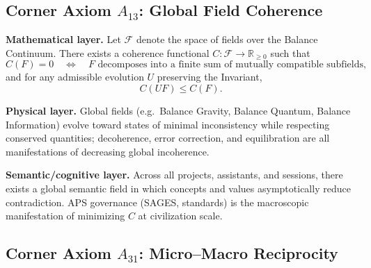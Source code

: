 \subsection{Corner Axiom $A_{13}$: Global Field Coherence}

\begin{axiom}
\label{ax:global-field}
\textbf{Mathematical layer.}
Let $\mathcal{F}$ denote the space of fields over the Balance Continuum.
There exists a coherence functional $C : \mathcal{F} \to \mathbb{R}_{\ge 0}$ such that
\[
  C(F) = 0 \quad \Longleftrightarrow \quad F \text{ decomposes into a finite sum of mutually compatible subfields},
\]
and for any admissible evolution $U$ preserving the Invariant,
\[
  C(UF) \leq C(F).
\]

\textbf{Physical layer.}
Global fields (e.g.\ Balance Gravity, Balance Quantum, Balance Information) evolve toward states of minimal inconsistency while respecting conserved quantities; decoherence, error correction, and equilibration are all manifestations of decreasing global incoherence.\cite{AurphyxThesis,AurphyxSymbiotic}

\textbf{Semantic/cognitive layer.}
Across all projects, assistants, and sessions, there exists a global semantic field in which concepts and values asymptotically reduce contradiction.
APS governance (SAGES, standards) is the macroscopic manifestation of minimizing $C$ at civilization scale.
\end{axiom}

\subsection{Corner Axiom $A_{31}$: Micro–Macro Reciprocity}

